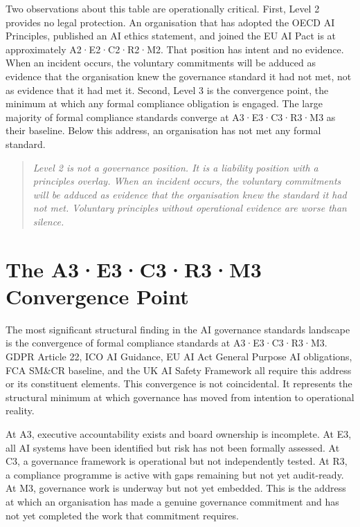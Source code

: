 Two observations about this table are operationally critical. First, Level 2 provides no legal protection. An organisation that has adopted the OECD AI Principles, published an AI ethics statement, and joined the EU AI Pact is at approximately A2·E2·C2·R2·M2. That position has intent and no evidence. When an incident occurs, the voluntary commitments will be adduced as evidence that the organisation knew the governance standard it had not met, not as evidence that it had met it. Second, Level 3 is the convergence point, the minimum at which any formal compliance obligation is engaged. The large majority of formal compliance standards converge at A3·E3·C3·R3·M3 as their baseline. Below this address, an organisation has not met any formal standard.

\begin{quote}
\emph{Level 2 is not a governance position. It is a liability position with a principles overlay. When an incident occurs, the voluntary commitments will be adduced as evidence that the organisation knew the standard it had not met. Voluntary principles without operational evidence are worse than silence.}
\end{quote}

\scenebreak

\section{The A3·E3·C3·R3·M3 Convergence Point}

The most significant structural finding in the AI governance standards landscape is the convergence of formal compliance standards at A3·E3·C3·R3·M3. GDPR Article 22, ICO AI Guidance, EU AI Act General Purpose AI obligations, FCA SM\&CR baseline, and the UK AI Safety Framework all require this address or its constituent elements. This convergence is not coincidental. It represents the structural minimum at which governance has moved from intention to operational reality.

At A3, executive accountability exists and board ownership is incomplete. At E3, all AI systems have been identified but risk has not been formally assessed. At C3, a governance framework is operational but not independently tested. At R3, a compliance programme is active with gaps remaining but not yet audit-ready. At M3, governance work is underway but not yet embedded. This is the address at which an organisation has made a genuine governance commitment and has not yet completed the work that commitment requires.

